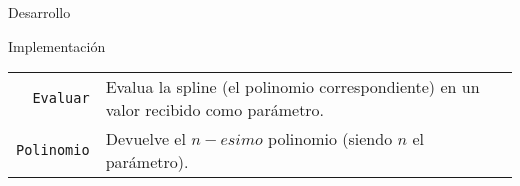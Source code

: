 \begin{section}{Desarrollo}
\begin{subsection}{Implementación}
\begin{itemize}
				\begin{tabular}{rl}
					\texttt{Evaluar} & Evalua la spline (el polinomio correspondiente) en un valor recibido como parámetro.\\
					\texttt{Polinomio} & Devuelve el $n-esimo$ polinomio (siendo $n$ el parámetro).\\
				\end{tabular}\\
		\end{itemize}
	\end{subsection}
\end{section}
